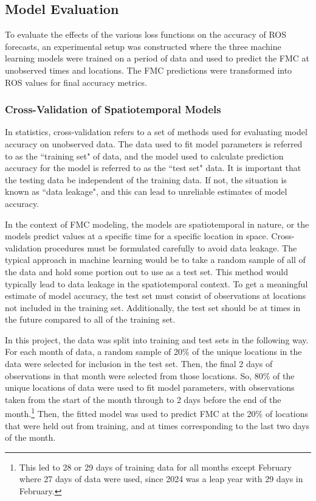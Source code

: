 \documentclass[11pt]{article}%
\begin{document}
\subsection{Model Evaluation}

To evaluate the effects of the various loss functions on the accuracy of ROS forecasts, an experimental setup was constructed where the three machine learning models were trained on a period of data and used to predict the FMC at unobserved times and locations. The FMC predictions were transformed into ROS values for final accuracy metrics. 

\subsubsection{Cross-Validation of Spatiotemporal Models}
\label{sec:cv}

In statistics, cross-validation refers to a set of methods used for evaluating model accuracy on unobserved data.\cite{Hastie-2010-ESL} The data used to fit model parameters is referred to as the ``training set" of data, and the model used to calculate prediction accuracy for the model is referred to as the ``test set" data. It is important that the testing data be independent of the training data. If not, the situation is known as ``data leakage", and this can lead to unreliable estimates of model accuracy.

In the context of FMC modeling, the models are spatiotemporal in nature, or the models predict values at a specific time for a specific location in space. Cross-validation procedures must be formulated carefully to avoid data leakage. The typical approach in machine learning would be to take a random sample of all of the data and hold some portion out to use as a test set. This method would typically lead to data leakage in the spatiotemporal context. To get a meaningful estimate of model accuracy, the test set must consist of observations at locations not included in the training set. Additionally, the test set should be at times in the future compared to all of the training set. 

In this project, the data was split into training and test sets in the following way. For each month of data, a random sample of 20\% of the unique locations in the data were selected for inclusion in the test set. Then, the final 2 days of observations in that month were selected from those locations. So, 80\% of the unique locations of data were used to fit model parameters, with observations taken from the start of the month through to 2 days before the end of the month.\footnote{This led to 28 or 29 days of training data for all months except February where 27 days of data were used, since 2024 was a leap year with 29 days in February.} Then, the fitted model was used to predict FMC at the 20\% of locations that were held out from training, and at times corresponding to the last two days of the month. 
\end{document}
